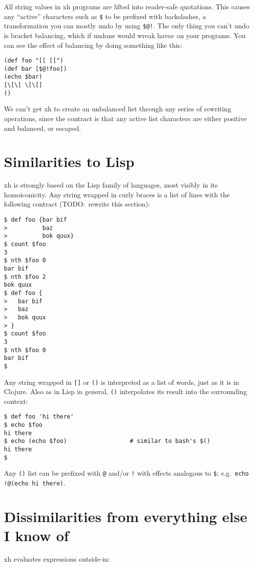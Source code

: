 \documentclass{report}
\begin{document}
  All string values in xh programs are lifted into reader-safe quotations. This
  causes any ``active'' characters such as \verb|$| to be prefixed with
  backslashes, a transformation you can mostly undo by using \verb|$@!|. The
  only thing you can't undo is bracket balancing, which if undone would wreak
  havoc on your programs. You can see the effect of balancing by doing
  something like this:

\begin{verbatim}
(def foo "[[ [[")
(def bar [$@!foo])
(echo $bar)
[\[\[ \[\[]
()
\end{verbatim}

  We can't get xh to create an unbalanced list through any series of rewriting
  operations, since the contract is that any active list characters are either
  positive and balanced, or escaped.

\chapter{Similarities to Lisp}\label{chp:similarities-to-lisp}
  xh is strongly based on the Lisp family of languages, most visibly in its
  homoiconicity. Any string wrapped in curly braces is a list of lines with the
  following contract (TODO:~rewrite this section):

\begin{verbatim}
$ def foo {bar bif
>          baz
>          bok quux}
$ count $foo
3
$ nth $foo 0
bar bif
$ nth $foo 2
bok quux
$ def foo {
>   bar bif
>   baz
>   bok quux
> }
$ count $foo
3
$ nth $foo 0
bar bif
$
\end{verbatim}

  Any string wrapped in \verb|[]| or \verb|()| is interpreted as a list of
  words, just as it is in Clojure. Also as in Lisp in general, \verb|()|
  interpolates its result into the surrounding context:

\begin{verbatim}
$ def foo 'hi there'
$ echo $foo
hi there
$ echo (echo $foo)                  # similar to bash's $()
hi there
$
\end{verbatim}

  Any \verb|()| list can be prefixed with \verb|@| and/or \verb|!| with effects
  analogous to \verb|$|; e.g.~\verb|echo !@(echo hi there)|.

\chapter{Dissimilarities from everything else I know of}\label{chp:dissimilarities}
  xh evaluates expressions outside-in:
\end{document}
